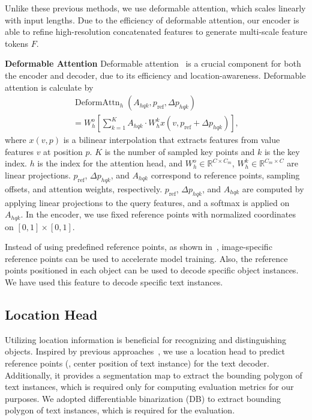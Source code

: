 \documentclass[10pt,twocolumn,letterpaper]{article}
\begin{document}
Unlike these previous methods, we use deformable attention, which scales linearly with input lengths. Due to the efficiency of deformable attention, our encoder is able to refine high-resolution concatenated features to generate multi-scale feature tokens \(F\).

\noindent\textbf{Deformable Attention} Deformable attention~\cite{zhu2021deformable} is a crucial component for both the encoder and decoder, due to its efficiency and location-awareness. Deformable attention is calculate by
\begin{multline}
\operatorname{DeformAttn}_h(A_{hqk}, p_\text{ref}, \Delta p_{hqk}) \\
= W_h^o\left[\sum_{k=1}^K A_{hqk}\cdot W_h^k x(v, p_{\text{ref}} + \Delta p_{hqk})\right],
\end{multline}
where \(x(v, p)\) is a bilinear interpolation that extracts features from value features \(v\) at position \(p\). \(K\) is the number of sampled key points and \(k\) is the key index. \(h\) is the index for the attention head, and \(W_h^o \in \mathbb{R}^{C \times C_m}\), \(W_h^k \in \mathbb{R}^{C_m \times C}\) are linear projections. \(p_{\text{ref}}\), \(\Delta p_{hqk}\), and \(A_{hqk}\) correspond to reference points, sampling offsets, and attention weights, respectively. \(p_{\text{ref}}\), \(\Delta p_{hqk}\), and \(A_{hqk}\) are computed by applying linear projections to the query features, and a softmax is applied on \(A_{hqk}\). In the encoder, we use fixed reference points with normalized coordinates on \([0, 1]\times[0, 1]\).


Instead of using predefined reference points, as shown in~\cite{yao2021efficient}, image-specific reference points can be used to accelerate model training. Also, the reference points positioned in each object can be used to decode specific object instances. We have used this feature to decode specific text instances.

\subsection{Location Head}

Utilizing location information is beneficial for recognizing and distinguishing objects. Inspired by previous approaches~\cite{yao2021efficient, li2021panoptic}, we use a location head to predict reference points (\ie, center position of text instance) for the text decoder.
Additionally, it provides a segmentation map to extract the bounding polygon of text instances, which is required only for computing evaluation metrics for our purposes. We adopted differentiable binarization (DB) \cite{liao2020real} to extract bounding polygon of text instances, which is required for the evaluation.
\end{document}
